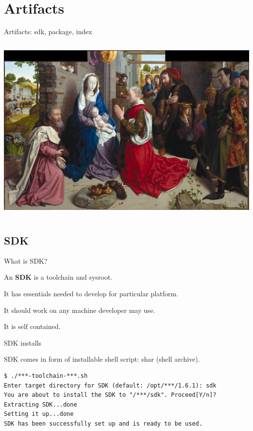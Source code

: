 \documentclass{beamer}
\begin{document}
\section{Artifacts}

\begin{frame}{Artifacts: sdk, package, index}
    \begin{columns}
        \centering
        \includegraphics[width=\linewidth]{Hugo_van_der_Goes_-_The_Adoration_of_the_Kings.jpg}
    \end{columns}
\end{frame}

\subsection{SDK}

\begin{frame}{What is SDK?}
    \begin{block}{}
        An \textbf{SDK} is a toolchain and sysroot.
    \end{block}
    \begin{block}{}
        It has essentials needed to develop for particular platform.
    \end{block}
    \begin{block}{}
        It should work on any machine developer may use.
    \end{block}
    \begin{block}{}
        It is self contained.
    \end{block}
\end{frame}

\begin{frame}[fragile]{SDK installs}
\begin{block}{}
SDK comes in form of installable shell script: shar
(shell archive).
\end{block}
\begin{lstlisting}[style=Console]
$ ./***-toolchain-***.sh
Enter target directory for SDK (default: /opt/***/1.6.1): sdk
You are about to install the SDK to "/***/sdk". Proceed[Y/n]?
Extracting SDK...done
Setting it up...done
SDK has been successfully set up and is ready to be used.
\end{lstlisting}
\end{frame}
\end{document}
